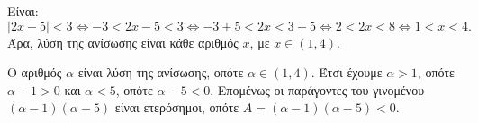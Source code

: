 
\begin{alist}
\item Είναι:
\[|2x - 5| < 3 \Leftrightarrow -3 < 2x - 5 < 3 \Leftrightarrow -3 + 5 < 2x < 3 + 5 \Leftrightarrow 2 < 2x < 8 \Leftrightarrow 1 < x < 4.\]
Άρα, λύση της ανίσωσης είναι κάθε αριθμός $x$, με $x \in (1, 4)$.

\item Ο αριθμός $\alpha$ είναι λύση της ανίσωσης, οπότε $\alpha \in (1, 4)$. Έτσι έχουμε $\alpha > 1$, οπότε $\alpha - 1 > 0$
και $\alpha < 5$, οπότε $\alpha - 5 < 0$.
Επομένως οι παράγοντες του γινομένου $(\alpha - 1)(\alpha - 5)$ είναι ετερόσημοι, οπότε 
$A = (\alpha - 1)(\alpha - 5) < 0$.
\end{alist}

